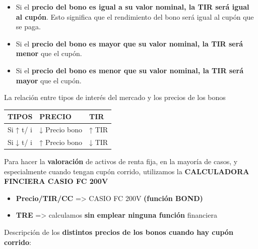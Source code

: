 \documentclass[
  letterpaper,
  DIV=11,
  numbers=noendperiod]{scrartcl}
\begin{document}
\begin{itemize}
\item
  Si el \textbf{precio del bono es igual a su valor nominal, la TIR será
  igual al cupón}. Esto significa que el rendimiento del bono será igual
  al cupón que se paga.
\item
  Si el \textbf{precio del bono es mayor que su valor nominal, la TIR
  será menor} que el cupón.
\item
  Si el \textbf{precio del bono es menor que su valor nominal, la TIR
  será mayor} que el cupón.
\end{itemize}

La relación entre tipos de interés del mercado y los precios de los
bonos

\begin{longtable}[]{@{}lll@{}}
\toprule\noalign{}
TIPOS & PRECIO & TIR \\
\midrule\noalign{}
\endhead
\bottomrule\noalign{}
\endlastfoot
Si ↑ t/ i & ↓ Precio bono & ↑ TIR \\
Si ↓ t/ i & ↑ Precio bono & ↓ TIR \\
\end{longtable}

\begin{tcolorbox}[enhanced jigsaw, colframe=quarto-callout-important-color-frame, opacityback=0, colback=white, leftrule=.75mm, left=2mm, breakable, arc=.35mm, rightrule=.15mm, toprule=.15mm, bottomrule=.15mm]
\begin{minipage}[t]{5.5mm}
\textcolor{quarto-callout-important-color}{\faExclamation}
\end{minipage}%
\begin{minipage}[t]{\textwidth - 5.5mm}

Para hacer la \textbf{valoración} de activos de renta fija, en la
mayoría de casos, y especialmente cuando tengan cupón corrido,
utilizamos la \textbf{CALCULADORA FINCIERA CASIO FC 200V}

\begin{itemize}
\item
  \textbf{Precio/TIR/CC} =\textgreater{} CASIO FC 200V \textbf{(función
  BOND)}
\item
  \textbf{TRE} =\textgreater{} calculamos \textbf{sin emplear ninguna
  función} financiera
\end{itemize}

\end{minipage}%
\end{tcolorbox}

Descripción de los \textbf{distintos precios de los bonos cuando hay
cupón corrido}:
\end{document}
